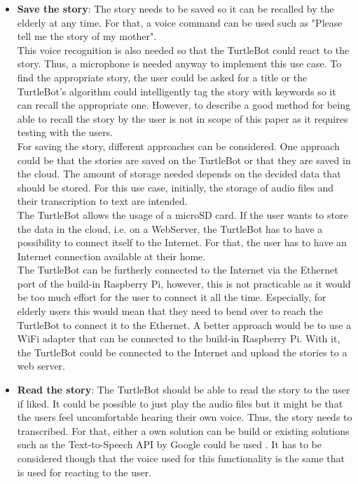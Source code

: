 \documentclass[plainarticle,zihtitle,english,final,hyperref,utf8]{zihpub}
\begin{document}
\begin{itemize}
    \item \textbf{Save the story}: The story needs to be saved so it can be recalled by the elderly at any time. For that, a voice command can be used such as "Please tell me the story of my mother". \\
    \newline
    This voice recognition is also needed so that the TurtleBot could react to the story. Thus, a microphone is needed anyway to implement this use case. To find the appropriate story, the user could be asked for a title or the TurtleBot's algorithm could intelligently tag the story with keywords so it can recall the appropriate one. However, to describe a good method for being able to recall the story by the user is not in scope of this paper as it requires testing with the users.\\
    \newline
    For saving the story, different approaches can be considered. One approach could be that the stories are saved on the TurtleBot or that they are saved in the cloud. The amount of storage needed depends on the decided data that should be stored. For this use case, initially, the storage of audio files and their transcription to text are intended. \\
    The TurtleBot allows the usage of a microSD card. If the user wants to store the data in the cloud, i.e. on a WebServer, the TurtleBot has to have a possibility to connect itself to the Internet. For that, the user has to have an Internet connection available at their home. \\
    The TurtleBot can be furtherly connected to the Internet via the Ethernet port of the build-in Raspberry Pi, however, this is not practicable as it would be too much effort for the user to connect it all the time. Especially, for elderly users this would mean that they need to bend over to reach the TurtleBot to connect it to the Ethernet. A better approach would be to use a WiFi adapter that can be connected to the build-in Raspberry Pi. With it, the TurtleBot could be connected to the Internet and upload the stories to a web server.\\
    \item \textbf{Read the story}: The TurtleBot should be able to read the story to the user if liked. It could be possible to just play the audio files but it might be that the users feel uncomfortable hearing their own voice. Thus, the story needs to transcribed. For that, either a own solution can be build or existing solutions such as the Text-to-Speech API by Google could be used \cite{google}. It has to be considered though that the voice used for this functionality is the same that is used for reacting to the user.\\

\end{itemize}
\end{document}

